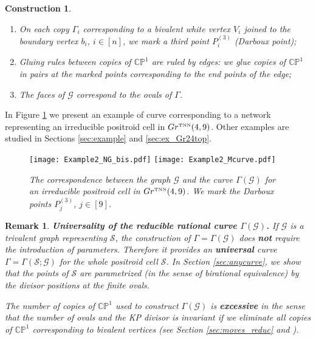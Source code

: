 \documentclass[11pt]{amsart}
\theoremstyle{plain}
\numberwithin{equation}{section}
\newtheorem{remark}{Remark}[subsection]
\newtheorem{construction}{Construction}[subsection]
\begin{document}
\begin{construction}
\begin{enumerate}
\item On each copy $\Gamma_{i}$ corresponding to a bivalent white vertex $V_{i}$ joined to the boundary vertex $b_{i}$, $i\in [n]$, we mark a third point  $P^{(3)}_i$ (Darboux point); 
\item Gluing rules between copies of $\mathbb{CP}^1$ are ruled by edges: we glue copies of $\mathbb{CP}^1$ in pairs at the marked points corresponding to the end points of the edge;
\item The faces of $\mathcal G$ correspond to the ovals of $\Gamma$.  
\end{enumerate}
\end{construction}

In Figure \ref{fig:net_curve} we present an example of curve corresponding to a network representing an irreducible positroid cell
in $Gr^{\mbox{\tiny TNN}} (4,9)$. Other examples are studied  in Sections \ref{sec:example} and \ref{sec:ex_Gr24top}.

\begin{figure}%
  \centering
  {\texttt{[image: Example2\_NG\_bis.pdf]}}
  \hfill
	{\texttt{[image: Example2\_Mcurve.pdf]}}
  \caption{\small{\sl The correspondence between the graph $\mathcal G$ and the curve $\Gamma (\mathcal G)$ for an irreducible positroid cell in $Gr^{\mbox{\tiny TNN}} (4,9)$. We mark the Darboux points $P^{(3)}_j$, $j\in [9]$.}}
	\label{fig:net_curve}
\end{figure}

\begin{remark} \textbf{Universality of the reducible rational curve $\Gamma(\mathcal G)$.}
If $\mathcal G$ is a trivalent graph representing $\mathcal S$, the construction of $\Gamma=\Gamma(\mathcal G)$ does \textbf{not} require the introduction of parameters. Therefore it provides  an \textbf{universal} curve 
$\Gamma=\Gamma({\mathcal S};\mathcal G)$ for the whole positroid cell ${\mathcal S}$. In Section \ref{sec:anycurve}, we show that the points of ${\mathcal S}$ are parametrized (in the sense of birational equivalence) by the divisor positions at the finite ovals. 

The number of copies of $\mathbb{CP}^1$ used to construct $\Gamma(\mathcal G)$ is \textbf{excessive} in the sense that the number of ovals and the KP divisor is invariant if we eliminate 
all copies of $\mathbb{CP}^1$ corresponding to bivalent vertices (see Section \ref{sec:moves_reduc} and \cite{AG3}). 
\end{remark}
\end{document}
